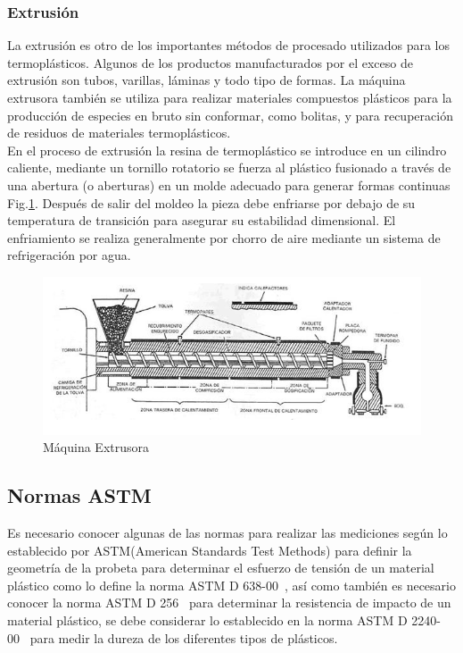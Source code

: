 \documentclass[a4paper, 11pt]{article}
\begin{document}
\subsubsection{Extrusión}
La extrusión es otro de los importantes métodos de procesado utilizados para los termoplásticos. Algunos de los productos manufacturados por el exceso de extrusión son tubos, varillas, láminas y todo tipo de formas. La máquina extrusora también se utiliza para realizar materiales compuestos plásticos para la producción de especies en bruto sin conformar, como bolitas, y para recuperación de residuos de materiales termoplásticos.\\
En el proceso de extrusión la resina de termoplástico se introduce en un cilindro caliente, mediante un tornillo rotatorio se fuerza al plástico fusionado a través de una abertura (o aberturas) en un molde adecuado para generar formas continuas Fig.\ref{maquina_extrusora}. Después de salir del moldeo la pieza debe enfriarse por debajo de su temperatura de transición para asegurar su estabilidad dimensional. El enfriamiento se realiza generalmente por chorro de aire mediante un sistema de refrigeración por agua.

\begin{figure}[h!] 
\centering
\captionsetup{justification=centering}
    \includegraphics[scale=0.75]{maquina_extrusora.png} 
     \caption{Máquina Extrusora}
    \label{maquina_extrusora}
\end{figure}

\subsection{Normas ASTM}
Es necesario conocer algunas de las normas para realizar las mediciones según lo establecido por  ASTM(American Standards Test Methods) para definir la geometría de la probeta para determinar el esfuerzo de tensión de un material plástico como lo define la norma ASTM D 638-00~\cite{astmd638}, así como también es necesario conocer la norma ASTM D 256~\cite{astmd256} para determinar la resistencia de impacto de un material plástico, se debe considerar lo establecido en la norma ASTM D 2240-00~\cite{astmd2240} para medir la dureza de los diferentes tipos de plásticos.
\end{document}
